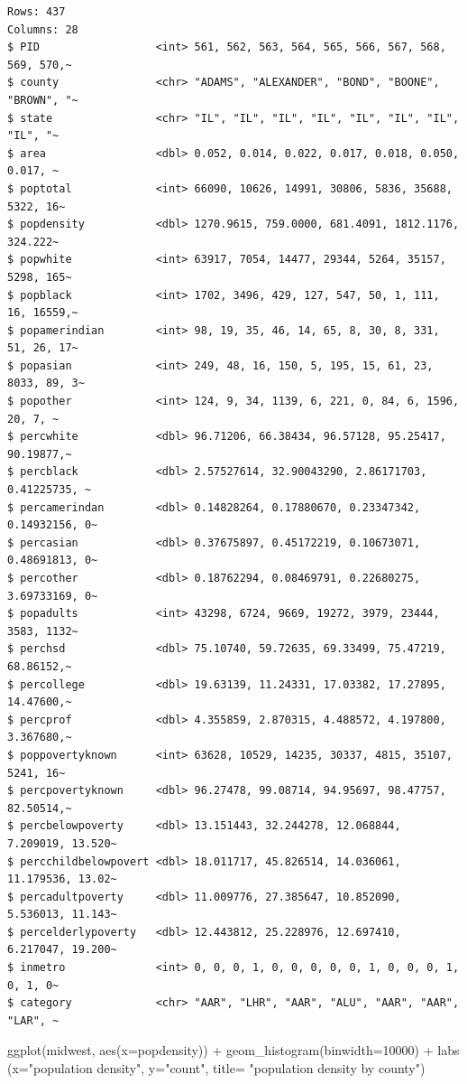 \documentclass[
  letterpaper,
  DIV=11,
  numbers=noendperiod]{scrartcl}
\newenvironment{Shaded}{\begin{snugshade}}{\end{snugshade}}
\newcommand{\AttributeTok}[1]{\textcolor[rgb]{0.40,0.45,0.13}{#1}}
\newcommand{\DecValTok}[1]{\textcolor[rgb]{0.68,0.00,0.00}{#1}}
\newcommand{\FunctionTok}[1]{\textcolor[rgb]{0.28,0.35,0.67}{#1}}
\newcommand{\NormalTok}[1]{\textcolor[rgb]{0.00,0.23,0.31}{#1}}
\newcommand{\SpecialCharTok}[1]{\textcolor[rgb]{0.37,0.37,0.37}{#1}}
\newcommand{\StringTok}[1]{\textcolor[rgb]{0.13,0.47,0.30}{#1}}
\begin{document}
\begin{verbatim}
Rows: 437
Columns: 28
$ PID                  <int> 561, 562, 563, 564, 565, 566, 567, 568, 569, 570,~
$ county               <chr> "ADAMS", "ALEXANDER", "BOND", "BOONE", "BROWN", "~
$ state                <chr> "IL", "IL", "IL", "IL", "IL", "IL", "IL", "IL", "~
$ area                 <dbl> 0.052, 0.014, 0.022, 0.017, 0.018, 0.050, 0.017, ~
$ poptotal             <int> 66090, 10626, 14991, 30806, 5836, 35688, 5322, 16~
$ popdensity           <dbl> 1270.9615, 759.0000, 681.4091, 1812.1176, 324.222~
$ popwhite             <int> 63917, 7054, 14477, 29344, 5264, 35157, 5298, 165~
$ popblack             <int> 1702, 3496, 429, 127, 547, 50, 1, 111, 16, 16559,~
$ popamerindian        <int> 98, 19, 35, 46, 14, 65, 8, 30, 8, 331, 51, 26, 17~
$ popasian             <int> 249, 48, 16, 150, 5, 195, 15, 61, 23, 8033, 89, 3~
$ popother             <int> 124, 9, 34, 1139, 6, 221, 0, 84, 6, 1596, 20, 7, ~
$ percwhite            <dbl> 96.71206, 66.38434, 96.57128, 95.25417, 90.19877,~
$ percblack            <dbl> 2.57527614, 32.90043290, 2.86171703, 0.41225735, ~
$ percamerindan        <dbl> 0.14828264, 0.17880670, 0.23347342, 0.14932156, 0~
$ percasian            <dbl> 0.37675897, 0.45172219, 0.10673071, 0.48691813, 0~
$ percother            <dbl> 0.18762294, 0.08469791, 0.22680275, 3.69733169, 0~
$ popadults            <int> 43298, 6724, 9669, 19272, 3979, 23444, 3583, 1132~
$ perchsd              <dbl> 75.10740, 59.72635, 69.33499, 75.47219, 68.86152,~
$ percollege           <dbl> 19.63139, 11.24331, 17.03382, 17.27895, 14.47600,~
$ percprof             <dbl> 4.355859, 2.870315, 4.488572, 4.197800, 3.367680,~
$ poppovertyknown      <int> 63628, 10529, 14235, 30337, 4815, 35107, 5241, 16~
$ percpovertyknown     <dbl> 96.27478, 99.08714, 94.95697, 98.47757, 82.50514,~
$ percbelowpoverty     <dbl> 13.151443, 32.244278, 12.068844, 7.209019, 13.520~
$ percchildbelowpovert <dbl> 18.011717, 45.826514, 14.036061, 11.179536, 13.02~
$ percadultpoverty     <dbl> 11.009776, 27.385647, 10.852090, 5.536013, 11.143~
$ percelderlypoverty   <dbl> 12.443812, 25.228976, 12.697410, 6.217047, 19.200~
$ inmetro              <int> 0, 0, 0, 1, 0, 0, 0, 0, 0, 1, 0, 0, 0, 1, 0, 1, 0~
$ category             <chr> "AAR", "LHR", "AAR", "ALU", "AAR", "AAR", "LAR", ~
\end{verbatim}

\begin{Shaded}
\begin{Highlighting}[]
\FunctionTok{ggplot}\NormalTok{(midwest, }\FunctionTok{aes}\NormalTok{(}\AttributeTok{x=}\NormalTok{popdensity)) }\SpecialCharTok{+}
  \FunctionTok{geom\_histogram}\NormalTok{(}\AttributeTok{binwidth=}\DecValTok{10000}\NormalTok{) }\SpecialCharTok{+}
  \FunctionTok{labs}\NormalTok{ (}\AttributeTok{x=}\StringTok{"population density"}\NormalTok{,}
        \AttributeTok{y=}\StringTok{"count"}\NormalTok{,}
        \AttributeTok{title=} \StringTok{"population density by county"}\NormalTok{)}
\end{Highlighting}
\end{Shaded}
\end{document}
